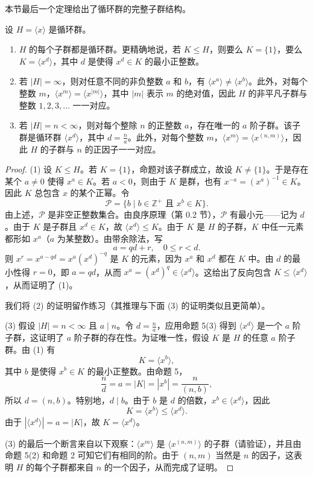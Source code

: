 本节最后一个定理给出了循环群的完整子群结构。

\begin{theorem}
设 \(H = \langle x \rangle\) 是循环群。
\begin{enumerate}[label=(\arabic*)]
\item \(H\) 的每个子群都是循环群。更精确地说，若 \(K \leq H\)，则要么 \(K = \{1\}\)，要么 \(K = \langle x^d \rangle\)，其中 \(d\) 是使得 \(x^d \in K\) 的最小正整数。
\item 若 \(|H| = \infty\)，则对任意不同的非负整数 \(a\) 和 \(b\)，有 \(\langle x^a \rangle \neq \langle x^b \rangle\)。此外，对每个整数 \(m\)，\(\langle x^m \rangle = \langle x^{|m|} \rangle\)，其中 \(|m|\) 表示 \(m\) 的绝对值，因此 \(H\) 的非平凡子群与整数 \(1, 2, 3, \ldots\) 一一对应。
\item 若 \(|H| = n < \infty\)，则对每个整除 \(n\) 的正整数 \(a\)，存在唯一的 \(a\) 阶子群。该子群是循环群 \(\langle x^d \rangle\)，其中 \(d = \frac{n}{a}\)。此外，对每个整数 \(m\)，\(\langle x^m \rangle = \langle x^{(n, m)} \rangle\)，因此 \(H\) 的子群与 \(n\) 的正因子一一对应。
\end{enumerate}
\end{theorem}

\begin{proof}
(1) 设 \(K \leq H\)。若 \(K = \{1\}\)，命题对该子群成立，故设 \(K \neq \{1\}\)。于是存在某个 \(a \neq 0\) 使得 \(x^a \in K\)。若 \(a < 0\)，则由于 \(K\) 是群，也有 \(x^{-a} = (x^a)^{-1} \in K\)。因此 \(K\) 总包含 \(x\) 的某个正幂。令
\[
\mathcal{P} = \{b \mid b \in \mathbb{Z}^+ \text{ 且 } x^b \in K\}.
\]
由上述，\(\mathcal{P}\) 是非空正整数集合。由良序原理（第 0.2 节），\(\mathcal{P}\) 有最小元——记为 \(d\)。由于 \(K\) 是子群且 \(x^d \in K\)，故 \(\langle x^d \rangle \leq K\)。由于 \(K\) 是 \(H\) 的子群，\(K\) 中任一元素都形如 \(x^a\)（\(a\) 为某整数）。由带余除法，写
\[
a = qd + r,\quad 0 \leq r < d.
\]
则 \(x^r = x^{a - qd} = x^a (x^d)^{-q}\) 是 \(K\) 的元素，因为 \(x^a\) 和 \(x^d\) 都在 \(K\) 中。由 \(d\) 的最小性得 \(r = 0\)，即 \(a = qd\)，从而 \(x^a = (x^d)^q \in \langle x^d \rangle\)。这给出了反向包含 \(K \leq \langle x^d \rangle\)，从而证明了 (1)。

我们将 (2) 的证明留作练习（其推理与下面 (3) 的证明类似且更简单）。

(3) 假设 \(|H| = n < \infty\) 且 \(a \mid n\)。令 \(d = \frac{n}{a}\)，应用命题 5(3) 得到 \(\langle x^d \rangle\) 是一个 \(a\) 阶子群，这证明了 \(a\) 阶子群的存在性。为证唯一性，假设 \(K\) 是 \(H\) 的任意 \(a\) 阶子群。由 (1) 有
\[
K = \langle x^b \rangle,
\]
其中 \(b\) 是使得 \(x^b \in K\) 的最小正整数。由命题 5，
\[
\frac{n}{d} = a = |K| = |x^b| = \frac{n}{(n, b)},
\]
所以 \(d = (n, b)\)。特别地，\(d \mid b\)。由于 \(b\) 是 \(d\) 的倍数，\(x^b \in \langle x^d \rangle\)，因此
\[
K = \langle x^b \rangle \leq \langle x^d \rangle.
\]
由于 \(|\langle x^d \rangle| = a = |K|\)，故 \(K = \langle x^d \rangle\)。

(3) 的最后一个断言来自以下观察：\(\langle x^m \rangle\) 是 \(\langle x^{(n, m)} \rangle\) 的子群（请验证），并且由命题 5(2) 和命题 2 可知它们有相同的阶。由于 \((n, m)\) 当然是 \(n\) 的因子，这表明 \(H\) 的每个子群都来自 \(n\) 的一个因子，从而完成了证明。
\end{proof}

